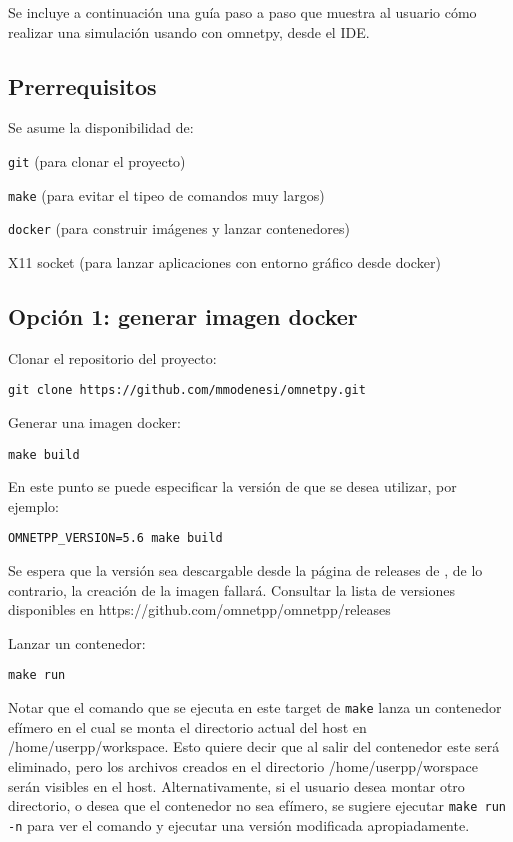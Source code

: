Se incluye a continuación una guía paso a paso que muestra al usuario cómo
realizar una simulación usando \omnetpp{} con omnetpy, desde el IDE.

\subsection{Prerrequisitos}

Se asume la disponibilidad de:

\verb!git! (para clonar el proyecto)

\verb!make! (para evitar el tipeo de comandos muy largos)

\verb!docker! (para construir imágenes y lanzar contenedores)

X11 socket (para lanzar aplicaciones con entorno gráfico desde docker)

\subsection{Opción 1: generar imagen docker}

Clonar el repositorio del proyecto:

\begin{verbatim}
git clone https://github.com/mmodenesi/omnetpy.git
\end{verbatim}

Generar una imagen docker:

\begin{verbatim}
make build
\end{verbatim}

En este punto se puede especificar la versión de \omnetpp{} que se desea utilizar, por ejemplo:

\begin{verbatim}
OMNETPP_VERSION=5.6 make build
\end{verbatim}

Se espera que la versión sea descargable desde la página de releases de
\omnetpp{}, de lo contrario, la creación de la imagen fallará. Consultar la lista
de versiones disponibles en https://github.com/omnetpp/omnetpp/releases

Lanzar un contenedor:

\begin{verbatim}
make run
\end{verbatim}

Notar que el comando que se ejecuta en este target de \verb!make! lanza un
contenedor efímero en el cual se monta el directorio actual del host en
/home/userpp/workspace. Esto quiere decir que al salir del contenedor este será
eliminado, pero los archivos creados en el directorio /home/userpp/worspace
serán visibles en el host. Alternativamente, si el usuario desea montar otro
directorio, o desea que el contenedor no sea efímero, se sugiere ejecutar
\verb!make run -n! para ver el comando y ejecutar una versión modificada
apropiadamente.

